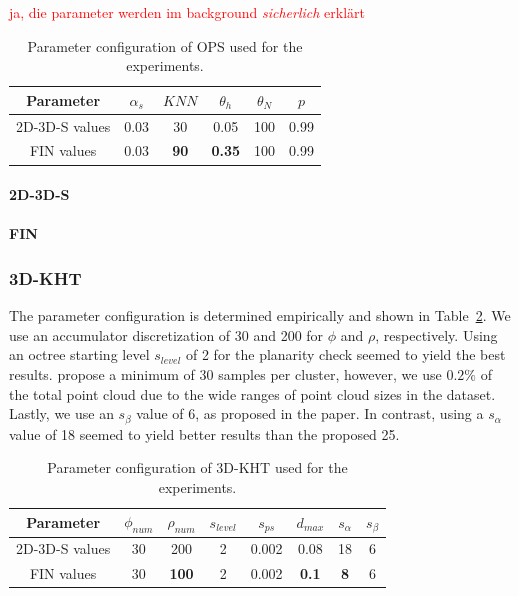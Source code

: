 \documentclass[main.tex]{subfiles}
\begin{document}
\textcolor{red}{ja, die parameter werden im background \textit{sicherlich} erklärt}
\begin{table}[H]
    \centering
    \begin{tabular}{c|ccccc}
        Parameter      & $\alpha_s$ & $KNN$       & $\theta_{h}$  & $\theta_{N}$ & $p$  \\ \hline
        2D-3D-S values & 0.03       & 30          & 0.05          & 100          & 0.99 \\
        FIN values     & 0.03       & \textbf{90} & \textbf{0.35} & 100          & 0.99
    \end{tabular}%
    \caption{Parameter configuration of OPS used for the experiments.}
    \label{tab:ops-param}
\end{table}

\paragraph{2D-3D-S}
\paragraph{FIN}

\subsubsection{3D-KHT}
The parameter configuration is determined empirically and shown in Table~\ref{tab:3dkht-param}. We use an accumulator discretization of 30 and 200 for $\phi$ and $\rho$, respectively.
Using an octree starting level $s_{level}$ of 2 for the planarity check seemed to yield the best results. \citeauthor{Limberger_Oliveira_2015}\cite{Limberger_Oliveira_2015} propose
a minimum of 30 samples per cluster, however, we use $0.2\%$ of the total point cloud due to the wide ranges of point cloud sizes in the dataset.
Lastly, we use an $s_\beta$ value of 6, as proposed in the paper. In contrast, using a $s_\alpha$ value of 18 seemed to yield better results than the proposed 25.
\begin{table}[H]
    \centering
    \begin{tabular}{c|ccccccc}
        Parameter      & $\phi_{num}$ & $\rho_{num}$ & $s_{level}$ & $s_{ps}$ & $d_{max}$    & $s_\alpha$ & $s_\beta$ \\ \hline
        2D-3D-S values & 30           & 200          & 2           & 0.002    & 0.08         & 18         & 6         \\
        FIN values     & 30           & \textbf{100} & 2           & 0.002    & \textbf{0.1} & \textbf{8} & 6
    \end{tabular}%
    \caption{Parameter configuration of 3D-KHT used for the experiments.}
    \label{tab:3dkht-param}
\end{table}
\end{document}
